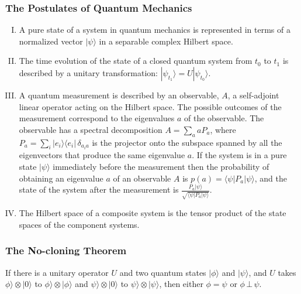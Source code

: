 \documentclass[UTF8,aspectratio=43,11pt,colorlinks,compress,openany]{beamer}%
\begin{document}
\begin{frame}\frametitle{The Postulates of Quantum Mechanics}
\begin{enumerate}[I.]
	\item A pure state of a system in quantum mechanics is represented in terms of a normalized vector $|\psi\rangle$ in a separable complex Hilbert space.
	\item The time evolution of the state of a closed quantum system from $t_0$ to $t_1$ is described by a unitary transformation: $|\psi_{t_1}\rangle = U|\psi_{t_0}\rangle$.
	\item A quantum measurement is described by an observable, $A$, a self-adjoint linear operator acting on the Hilbert space. The possible outcomes of the measurement correspond to the eigenvalues $a$ of the observable. The observable has a spectral decomposition $A=\sum\limits_a aP_a$, where $P_a=\sum\limits_i|e_i\rangle\langle e_i|\,\delta_{a_ia}$ is the projector onto the subspace spanned by all the eigenvectors that produce the same eigenvalue $a$. If the system is in a pure state $|\psi\rangle$ immediately before the measurement then the probability of obtaining an eigenvalue $a$ of an observable $A$ is $p(a)=\langle\psi|P_a|\psi\rangle$, and the state of the system after the measurement is $\frac{P_a|\psi\rangle}{\sqrt{\langle\psi|P_a|\psi\rangle}}$.
	\item The Hilbert space of a composite system is the tensor product of the state spaces of the component systems.
\end{enumerate}
\end{frame}

\begin{frame}\frametitle{The No-cloning Theorem}
	\begin{theorem}
	If there is a unitary operator $U$ and two quantum states $|\phi\rangle$ and $|\psi\rangle$, and $U$ takes $\phi\rangle\otimes|0\rangle$ to $\phi\rangle\otimes|\phi\rangle$ and $\psi\rangle\otimes|0\rangle$ to $\psi\rangle\otimes|\psi\rangle$, then either $\phi=\psi$ or $\phi\,\bot\,\psi$.
\end{theorem}
\end{frame}
\end{document}
